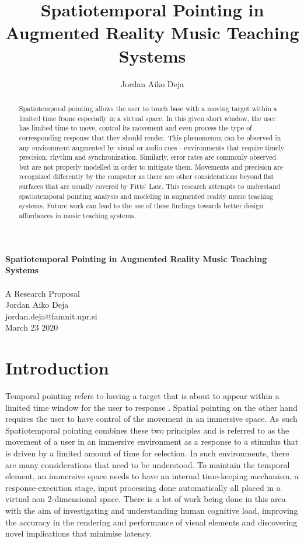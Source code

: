 \documentclass{article}
\title{Spatiotemporal Pointing in Augmented Reality Music Teaching Systems}
\author{Jordan Aiko Deja}
\begin{document}
\begin{center}
\large \textbf{Spatiotemporal Pointing in Augmented Reality Music Teaching Systems}
\\            
\vspace{0.5cm}\\
A Research Proposal\\
\vspace{0.5cm}
Jordan Aiko Deja\\
jordan.deja@famnit.upr.si\\
\vspace{0.5cm}
March 23 2020
\vspace{0.5cm}
\end{center}

\begin{abstract}
     Spatiotemporal pointing allows the user to touch base with a moving target within a limited time frame especially in a virtual space. In this given short window, the user has limited time to move, control its movement and even process the type of corresponding response that they should render. This phenomenon can be observed in any environment augmented by visual or audio cues - environments that require timely precision, rhythm and synchronization. Similarly, error rates are commonly observed but are not properly modelled in order to mitigate them. Movements and precision are recognized differently by the computer as there are other considerations beyond flat surfaces that are usually covered by Fitts' Law. This research attempts to understand spatiotemporal pointing analysis and modeling in augmented reality music teaching systems. Future work can lead to the use of these findings towards better design affordances in music teaching systems. 
\end{abstract}


\section{Introduction}
Temporal pointing refers to having a target that is about to appear within a limited time window for the user to response \cite{lee2016website}. Spatial pointing on the other hand requires the user to have control of the movement in an immersive space. As such Spatiotemporal pointing combines these two principles and is referred to as the movement of a user in an immersive environment as a response to a stimulus that is driven by a limited amount of time for selection. In such environments, there are many considerations that need to be understood. To maintain the temporal element, an immersive space needs to have an internal time-keeping mechanism, a response-execution stage, input processing done automatically all placed in a virtual non 2-dimensional space. There is a lot of work being done in this area with the aim of investigating and understanding human cognitive load, improving the accuracy in the rendering and performance of visual elements and discovering novel implications that minimise latency.\\
\end{document}
